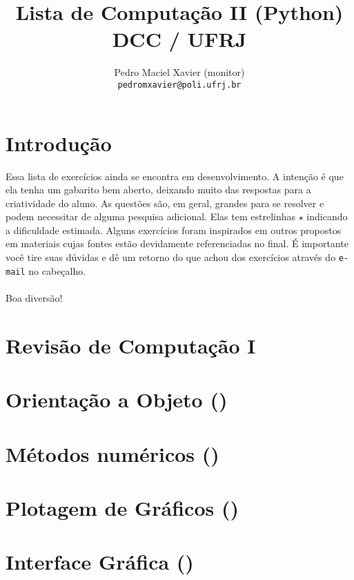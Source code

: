 \documentclass[12pt]{article}
\title{Lista de Computação II (Python) \\ {\normalsize DCC / UFRJ}}
\author{Pedro Maciel Xavier (monitor)\\ \texttt{pedromxavier@poli.ufrj.br}}
\begin{document}
	\maketitle
	\section*{Introdução}
	Essa lista de exercícios ainda se encontra em desenvolvimento. A intenção é que ela tenha um gabarito bem aberto, deixando muito das respostas para a criatividade do aluno. As questões são, em geral, grandes para se resolver e podem necessitar de alguma pesquisa adicional. Elas tem estrelinhas $\star$ indicando a dificuldade estimada. Alguns exercícios foram inspirados em outros propostos em materiais cujas fontes estão devidamente referenciadas no final. É importante você tire suas dúvidas e dê um retorno do que achou dos exercícios através do \texttt{e-mail} no cabeçalho.
	~\\
	~\\
	Boa diversão! \par
	\pagebreak
	
	
	\tableofcontents
	\pagebreak
	
	\section{Revisão de Computação I}
	
	\section{Orientação a Objeto ()}
	
	\section{Métodos numéricos ()}
	
	\section{Plotagem de Gráficos ()}
	
	\section{Interface Gráfica ()}
	
	
\end{document}
